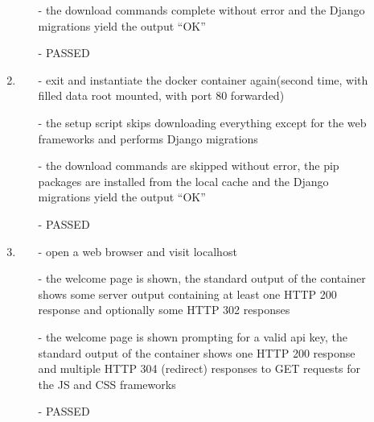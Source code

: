 \begin{description}
\begin{enumerate}
\begin{itemize}
			\item [-] the download commands complete without error and the Django migrations yield the output \enquote{OK}
			\item [-] PASSED
		\end{itemize}
		\item  
		\begin{itemize}
			\item [-] exit and instantiate the docker container again(second time, with filled data root mounted, with port 80 forwarded)
			\item [-] the setup script skips downloading everything except for the web frameworks and performs Django migrations
			\item [-] the download commands are skipped without error, the pip packages are installed from the local cache and the Django migrations yield the output \enquote{OK}
			\item [-] PASSED
		\end{itemize}
		\item  
		\begin{itemize}
			\item [-] open a web browser and visit localhost
			\item [-] the welcome page is shown, the standard output of the container shows some server output containing at least one HTTP 200 response and optionally some HTTP 302 responses
			\item [-] the welcome page is shown prompting for a valid api key, the standard output of the container shows one HTTP 200 response and multiple HTTP 304 (redirect) responses to GET requests for the JS and CSS frameworks
			\item [-] PASSED
		\end{itemize}
	\end{enumerate}
\end{description}

